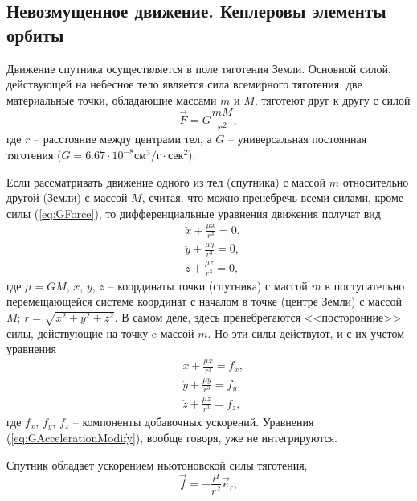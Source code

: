 \subsection{Невозмущенное движение. Кеплеровы элементы орбиты}
\noindent\indent Движение спутника осуществляется в поле тяготения Земли. Основной силой,
действующей на небесное тело является сила всемирного тяготения: две материальные точки,
обладающие массами $m$ и $M$, тяготеют друг к другу с силой
\begin{equation} \label{eq:GForce}
  \vec{F} = G\frac{mM}{r^2},
\end{equation}
где $r$ -- расстояние между центрами тел, а $G$ -- универсальная постоянная тяготения
($G = 6.67\cdot10^{-8}\text{см}^3/г\cdot\text{сек}^2$).\par
Если рассматривать движение одного из тел (спутника) с массой $m$ относительно
другой (Земли) с массой $M$, считая, что можно пренебречь всеми силами, кроме силы
(\ref{eq:GForce}), то дифференциальные уравнения движения получат вид
\begin{equation}
  \begin{aligned}
    &\ddot{x} + \frac{\mu x}{r^3} = 0, \\
    &\ddot{y} + \frac{\mu y}{r^3} = 0, \\
    &\ddot{z} + \frac{\mu z}{r^3} = 0,
  \end{aligned}
\end{equation}
где $\mu = GM$, $x$, $y$, $z$ -- координаты точки (спутника) с массой $m$ в
поступательно перемещающейся системе координат с началом в точке (центре Земли)
с массой $M$; $r = \sqrt{x^2 + y^2 + z^2}$. В самом деле, здесь пренебрегаются
<<посторонние>> силы, действующие на точку c массой $m$. Но эти силы действуют,
и с их учетом уравнения
\begin{equation} \label{eq:GAccelerationModify}
  \begin{aligned}
    &\ddot{x} + \frac{\mu x}{r^3} = f_x, \\
    &\ddot{y} + \frac{\mu y}{r^3} = f_y, \\
    &\ddot{z} + \frac{\mu z}{r^3} = f_z,
  \end{aligned}
\end{equation}
где $f_x$, $f_y$, $f_z$ -- компоненты добавочных ускорений. Уравнения
(\ref{eq:GAccelerationModify}), вообще говоря, уже не интегрируются.\par
Спутник обладает ускорением ньютоновской силы тяготения,
\begin{equation}  \label{eq:GAcceleration}
  \vec{f} = - \frac{\mu}{r^2}\vec{e}_r,
\end{equation}
